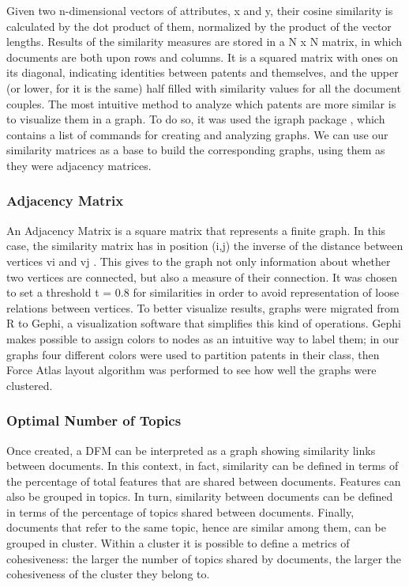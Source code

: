 \documentclass[b5paper,]{book}
\theoremstyle{definition}
\theoremstyle{definition}
\theoremstyle{definition}
\theoremstyle{remark}
\begin{document}
Given two n-dimensional vectors of attributes, x and y, their cosine
similarity is calculated by the dot product of them, normalized by the
product of the vector lengths. Results of the similarity measures are
stored in a N x N matrix, in which documents are both upon rows and
columns. It is a squared matrix with ones on its diagonal, indicating
identities between patents and themselves, and the upper (or lower, for
it is the same) half filled with similarity values for all the document
couples. The most intuitive method to analyze which patents are more
similar is to visualize them in a graph. To do so, it was used the
igraph package , which contains a list of commands for creating and
analyzing graphs. We can use our similarity matrices as a base to build
the corresponding graphs, using them as they were adjacency matrices.

\subsubsection*{Adjacency Matrix}\label{adjacency-matrix}

An Adjacency Matrix is a square matrix that represents a finite graph.
In this case, the similarity matrix has in position (i,j) the inverse of
the distance between vertices vi and vj . This gives to the graph not
only information about whether two vertices are connected, but also a
measure of their connection. It was chosen to set a threshold t = 0.8
for similarities in order to avoid representation of loose relations
between vertices. To better visualize results, graphs were migrated from
R to Gephi, a visualization software that simplifies this kind of
operations. Gephi makes possible to assign colors to nodes as an
intuitive way to label them; in our graphs four different colors were
used to partition patents in their class, then Force Atlas layout
algorithm was performed to see how well the graphs were clustered.

\subsubsection*{Optimal Number of
Topics}\label{optimal-number-of-topics}

Once created, a DFM can be interpreted as a graph showing similarity
links between documents. In this context, in fact, similarity can be
defined in terms of the percentage of total features that are shared
between documents. Features can also be grouped in topics. In turn,
similarity between documents can be defined in terms of the percentage
of topics shared between documents. Finally, documents that refer to the
same topic, hence are similar among them, can be grouped in cluster.
Within a cluster it is possible to define a metrics of cohesiveness: the
larger the number of topics shared by documents, the larger the
cohesiveness of the cluster they belong to.
\end{document}
